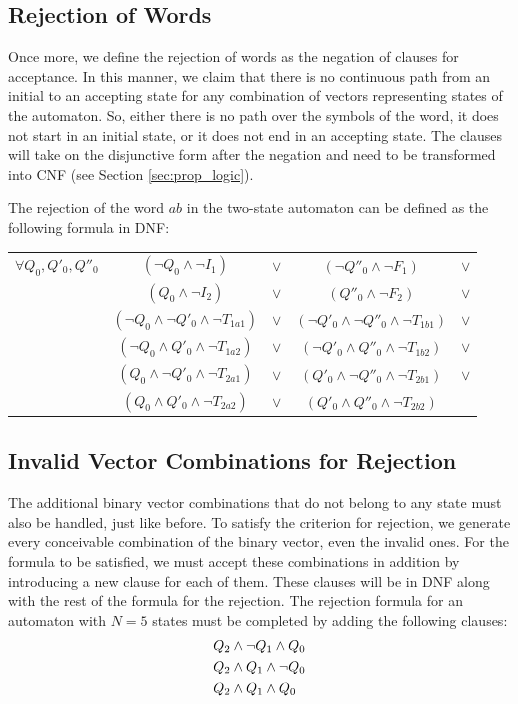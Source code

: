 \subsection{Rejection of Words}

Once more, we define the rejection of words as the negation of clauses for acceptance. In this manner, we claim that there is no continuous path from an initial to an accepting state for any combination of vectors representing states of the automaton. So, either there is no path over the symbols of the word, it does not start in an initial state, or it does not end in an accepting state. The clauses will take on the disjunctive form after the negation and need to be transformed into CNF (see Section \ref{sec:prop_logic}). \pagebreak

The rejection of the word $ab$ in the two-state automaton can be defined as the following formula in DNF:

\begin{center}
    \begin{tabular}{c c c c c}
     $\forall Q_0, Q'_0, Q''_0$ & $(\neg Q_0 \land \neg I_1)$ & $\lor $ & $(\neg Q''_0 \land \neg F_1)$ & $\lor $\\
      &   $(Q_0 \land \neg I_2)$    & $\lor $ &   $(Q''_0 \land \neg F_2)$ & $\lor $ \\ 
      &   $(\neg Q_0 \land \neg Q'_0 \land \neg T_{1a1})$    &  $\lor $ &  $(\neg Q'_0 \land \neg Q''_0 \land \neg T_{1b1})$   & $\lor $\\
      &   $(\neg Q_0 \land Q'_0 \land \neg T_{1a2})$    & $\lor $ &    $(\neg Q'_0 \land Q''_0 \land \neg T_{1b2})$  & $\lor $\\
     &   $(Q_0 \land \neg Q'_0 \land \neg T_{2a1})$    & $\lor $ &  $(Q'_0 \land \neg Q''_0 \land \neg T_{2b1})$ & $\lor $\\
     &   $(Q_0 \land Q'_0 \land \neg T_{2a2})$    &  $\lor $ &  $(Q'_0 \land Q''_0 \land \neg T_{2b2})$ &\\
\end{tabular}
\end{center}

\subsection{Invalid Vector Combinations for Rejection}

The additional binary vector combinations that do not belong to any state must also be handled, just like before. To satisfy the criterion for rejection, we generate every conceivable combination of the binary vector, even the invalid ones. For the formula to be satisfied, we must accept these combinations in addition by introducing a new clause for each of them. These clauses will be in DNF along with the rest of the formula for the rejection. The rejection formula for an automaton with $N=5$ states must be completed by adding the following clauses:
\begin{align*}
    \centering
    Q_2 &\land \neg Q_1 \land Q_0 \\
    Q_2 &\land Q_1 \land \neg Q_0 \\
    Q_2 &\land Q_1 \land Q_0
\end{align*}


